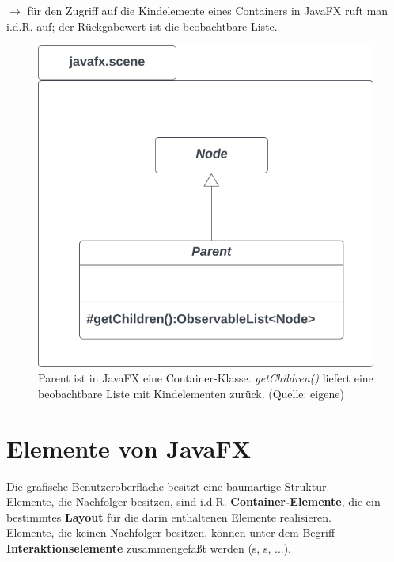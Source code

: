 \noindent
$\rightarrow$ für den Zugriff auf die Kindelemente eines Containers in JavaFX ruft man i.d.R.  auf; der Rückgabewert ist die beobachtbare Liste.

\begin{figure}
    \centering
    \includegraphics[scale=0.5]{chapters/fopt3/img/javafx/nodeparent}
    \caption{Parent ist in JavaFX eine Container-Klasse. \textit{getChildren()} liefert eine beobachtbare Liste mit Kindelementen zurück. (Quelle: eigene)}
    \label{fig:nodeparent}
\end{figure}

\section{Elemente von JavaFX}

Die grafische Benutzeroberfläche besitzt eine baumartige Struktur.\\

\noindent
Elemente, die Nachfolger besitzen, sind i.d.R. \textbf{Container-Elemente}, die ein bestimmtes \textbf{Layout} für die darin enthaltenen Elemente realisieren.\\

\noindent
Elemente, die keinen Nachfolger besitzen, können unter dem Begriff \textbf{Interaktionselemente} zusammengefaßt werden (s, s, ...).

